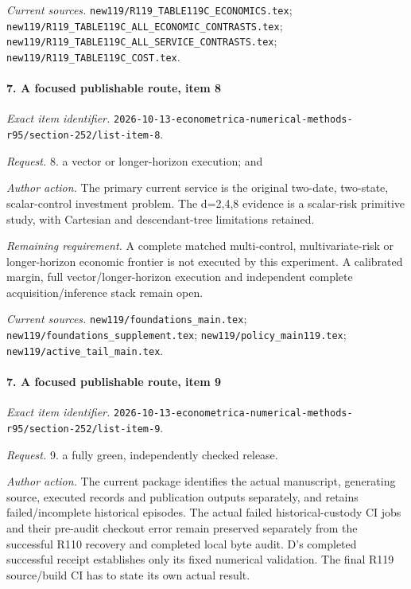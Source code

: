 \par\emph{Current sources.} \nolinkurl{new119/R119_TABLE119C_ECONOMICS.tex}; \nolinkurl{new119/R119_TABLE119C_ALL_ECONOMIC_CONTRASTS.tex}; \nolinkurl{new119/R119_TABLE119C_ALL_SERVICE_CONTRASTS.tex}; \nolinkurl{new119/R119_TABLE119C_COST.tex}.

\paragraph{7. A focused publishable route, item 8}

\emph{Exact item identifier.} \nolinkurl{2026-10-13-econometrica-numerical-methods-r95/section-252/list-item-8}.

\par\emph{Request.} 8. a vector or longer-horizon execution; and

\par\emph{Author action.} The primary current service is the original two-date, two-state, scalar-control investment problem. The d=2,4,8 evidence is a scalar-risk primitive study, with Cartesian and descendant-tree limitations retained.

\par\emph{Remaining requirement.} A complete matched multi-control, multivariate-risk or longer-horizon economic frontier is not executed by this experiment. A calibrated margin, full vector/\allowbreak{}longer-horizon execution and independent complete acquisition/\allowbreak{}inference stack remain open.

\par\emph{Current sources.} \nolinkurl{new119/foundations_main.tex}; \nolinkurl{new119/foundations_supplement.tex}; \nolinkurl{new119/policy_main119.tex}; \nolinkurl{new119/active_tail_main.tex}.

\paragraph{7. A focused publishable route, item 9}

\emph{Exact item identifier.} \nolinkurl{2026-10-13-econometrica-numerical-methods-r95/section-252/list-item-9}.

\par\emph{Request.} 9. a fully green, independently checked release.

\par\emph{Author action.} The current package identifies the actual manuscript, generating source, executed records and publication outputs separately, and retains failed/\allowbreak{}incomplete historical episodes. The actual failed historical-custody CI jobs and their pre-audit checkout error remain preserved separately from the successful R110 recovery and completed local byte audit. D's completed successful receipt establishes only its fixed numerical validation. The final R119 source/\allowbreak{}build CI has to state its own actual result.


